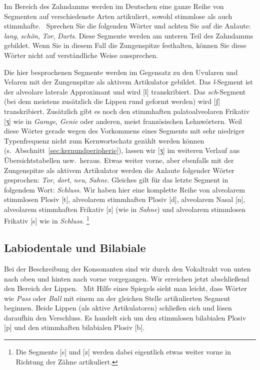 Im Bereich des Zahndamms werden im Deutschen eine ganze Reihe von Segmenten auf verschiedenste Arten artikuliert, sowohl stimmlose als auch stimmhafte.
\TuBegin~Sprechen Sie die folgenden Wörter und achten Sie auf die Anlaute: \textit{lang}, \textit{schön}, \textit{Tor}, \textit{Darts}.
Diese Segmente werden am unteren Teil des Zahndamms gebildet.
Wenn Sie in diesem Fall die Zungenspitze festhalten, können Sie diese Wörter nicht auf verständliche Weise aussprechen.

Die hier besprochenen Segmente werden im Gegensatz zu den Uvularen und Velaren mit der Zungenspitze als aktivem Artikulator gebildet.
Das \textit{l}-Segment ist der alveolare laterale Approximant und wird [l] transkribiert.
Das \textit{sch}-Segment (bei dem meistens zusätzlich die Lippen rund geformt werden) wird [ʃ] transkribiert.
Zusätzlich gibt es noch den stimmhaften palatoalveolaren Frikativ [ʒ] wie in \textit{Garage}, \textit{Genie} oder anderen, meist französischen Lehnwörtern.
Weil diese Wörter gerade wegen des Vorkommens eines Segments mit sehr niedriger Typenfrequenz nicht zum Kernwortschatz gezählt werden können (s.\ Abschnitt~\ref{sec:kernundperipherie}), lassen wir [ʒ] im weiteren Verlauf aus Übersichtstabellen usw.\ heraus.
Etwas weiter vorne, aber ebenfalls mit der Zungenspitze als aktivem Artikulator werden die Anlaute folgender Wörter gesprochen: \textit{Tor}, \textit{dort}, \textit{neu}, \textit{Sahne}.
Gleiches gilt für das letzte Segment in folgendem Wort: \textit{Schluss}.
Wir haben hier eine komplette Reihe von alveolarem stimmlosen Plosiv [t], alveolarem stimmhaften Plosiv [d], alveolarem Nasal [n], alveolarem stimmhaften Frikativ [z] (wie in \textit{Sahne}) und alveolarem stimmlosen Frikativ [s] wie in \textit{Schluss}.%
\footnote{Die Segmente [s] und [z] werden dabei eigentlich etwas weiter vorne in Richtung der Zähne artikuliert.}

\subsection{Labiodentale und Bilabiale}
\label{sec:labiodentaleundbilabiale}


Bei der Beschreibung der Konsonanten sind wir durch den Vokaltrakt von unten nach oben und hinten nach vorne vorgegangen.
Wir erreichen jetzt abschließend den Bereich der Lippen.
\TuBegin~Mit Hilfe eines Spiegels sieht man leicht, dass Wörter wie \textit{Pass} oder \textit{Ball} mit einem an der gleichen Stelle artikulierten Segment beginnen.
Beide Lippen (als aktive Artikulatoren) schließen sich und lösen daraufhin den Verschluss.
Es handelt sich um den stimmlosen bilabialen Plosiv [p] und den stimmhaften bilabialen Plosiv [b].

